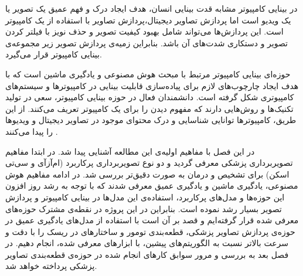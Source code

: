 در بینایی کامپیوتر مشابه قدت بینایی انسان، هدف ایجاد درک و فهم عمیق یک تصویر یا یک ویدیو است اما پردازش تصاویر دیجیتال،پردازش تصاویر با استفاده از یک کامپیوتر است. این پردازش‌ها می‌تواند شامل بهبود کیفیت تصویر و حذف نویز با فیلتر کردن تصویر و دستکاری شدت‌های آن باشد. بنابراین زمیه‌ی پردازش‌ تصویر زیر مجموعه‌ی بینایی کامپیوتر قرار می‌گیرد. 

حوزه‌ای بینایی کامپیوتر مرتبط با مبحث هوش مصنوعی و یادگیری ماشین است که با هدف ایجاد چارچوب‌های لازم برای پیاده‌سازی قابلیت بینایی در کامپیوترها و سیستم‌های کامپیوتری شکل گرفته‌ است. دانشمندان فعال در حوزه بینایی کامپیوتر، سعی در تولید تکنیک‌ها و روش‌هایی دارند که مفهوم دیدن را برای یک کامپیوتر تعریف می‌کنند. از این طریق، کامپیوترها توانایی شناسایی و درک محتوای موجود در تصاویر دیجیتال و ویدیو‌ها را پیدا می‌کنند .

در این فصل با مفاهیم اولیه‌ی این مطالعه آشنایی پیدا شد. در ابتدا مفاهیم تصویربرداری پزشکی معرفی گردید و دو نوع تصویربرداری پرکاربرد (ام‌آزآی و سی‌تی اسکن) برای تشخیص و درمان به صورت دقیق‌تر بررسی شد. در ادامه مفاهیم هوش مصنوعی، یادگیری ماشین و یادگیری عمیق معرفی شدند که با توجه به رشد روز افزون این حوزه‌ها و مدل‌های پرکاربرد، استفاده‌ی این مدل‌ها در بینایی کامپیوتر و پردازش تصویر بسیار رشد نموده است. بنابراین در این پروژه در نقطه‌ی مشترک حوزه‌های معرفی شده قرار گرفته‌ایم و قصد بر آن است با استفاده از مدل‌های یادگیری عمیق در حوزه‌ی پردازش تصاویر پزشکی، قطعه‌بندی تومور و ساختارهای در ریسک را با دقت و سرعت بالاتر نسبت به الگوریتم‌های پیشین، با ابزارهای معرفی شده، انجام دهیم. در فصل بعد به بررسی و مرور سوابق کارهای انجام شده در حوزه‌ی قطعه‌بندی تصاویر پزشکی پرداخته خواهد شد.